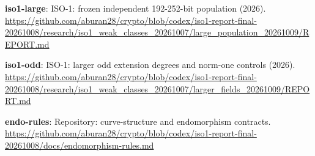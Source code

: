 \documentclass[10pt]{article}
\begin{document}
\textbf{iso1-large}: ISO-1: frozen independent 192-252-bit population (2026).\\\url{https://github.com/aburan28/crypto/blob/codex/iso1-report-final-20261008/research/iso1_weak_classes_20261007/large_population_20261009/REPORT.md}\par
\textbf{iso1-odd}: ISO-1: larger odd extension degrees and norm-one controls (2026).\\\url{https://github.com/aburan28/crypto/blob/codex/iso1-report-final-20261008/research/iso1_weak_classes_20261007/larger_fields_20261009/REPORT.md}\par
\textbf{endo-rules}: Repository: curve-structure and endomorphism contracts.\\\url{https://github.com/aburan28/crypto/blob/codex/iso1-report-final-20261008/docs/endomorphism-rules.md}\par
\end{document}
